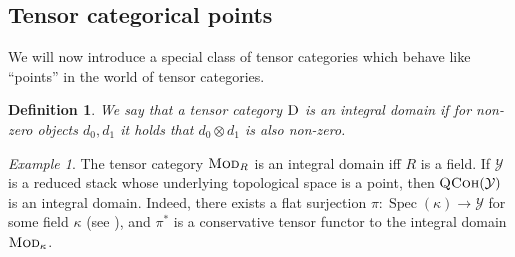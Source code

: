 \documentclass[12pt, oneside]{amsart}
\numberwithin{equation}{section}
\newtheorem{definition}[subsubsection]{Definition}
\theoremstyle{remark}
\newtheorem{example}[subsubsection]{Example}
\theoremstyle{plain}
\newcommand{\DD}{\textsc{D}}
\newcommand{\Mod}{\textsc{Mod}}
\DeclareMathOperator{\QCoh}{\textsc{QCoh}}
\newcommand{\YY}{\mathcal{Y}}
\DeclareMathOperator{\spc}{Spec}
\begin{document}
\subsection{Tensor categorical points}

We will now introduce a special class of tensor categories which behave like ``points'' in the world of tensor categories.

\begin{definition} We say that a tensor category $\DD$ is an \emph{integral domain} if for non-zero objects $d_{0},d_{1}$ it holds that $d_{0}\otimes d_{1}$ is also non-zero. \end{definition}

\begin{example} The tensor category $\Mod_{R}$ is an integral domain iff $R$ is a field. If $\YY$ is a reduced stack whose underlying topological space is a point, then $\QCoh(\YY)$ is an integral domain. Indeed, there exists a flat surjection $\pi:\spc(\kappa)\rightarrow\YY$ for some field $\kappa$ (see \cite[Tag~06MN]{StacksProject}), and $\pi^{*}$ is a conservative tensor functor to the integral domain $\Mod_{\kappa}$. \end{example}
\end{document}

